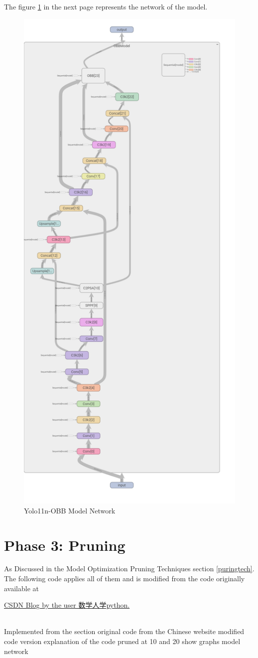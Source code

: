 The figure \ref{Yolo11nnetwork} in the next page represents the network of the model.

\begin{figure}[H]
    \centering
    \includegraphics[width=0.65\linewidth]{figures/obb_train8 (2).png}
    \caption{Yolo11n-OBB Model Network}
    \label{Yolo11nnetwork}
\end{figure}

\section{Phase 3: Pruning}
As Discussed in the Model Optimization Pruning Techniques section \ref{puringtech}. The following code applies all of them and is modified from the code originally available at 
\begin{CJK*}{UTF8}{gbsn} \href{https://blog.csdn.net/W_extend/article/details/144070375}{CSDN Blog by the user 数学人学python.} \end{CJK*}
\\
Implemented from the section 
original code from the Chinese website
modified code version
explanation of the code 
pruned at 10 and 20
show graphs
model network 






